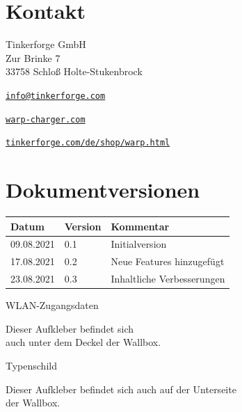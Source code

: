 \documentclass[a4paper,10pt]{article}
\begin{document}
\begin{multicols*}{2}
	\section{Kontakt}
	Tinkerforge GmbH\\ Zur Brinke 7\\ 33758 Schloß Holte-Stukenbrock\\
	\begin{description}[leftmargin=!,labelwidth=\widthof{\textbf{Website}}]
		\item[E-Mail] \href{mailto:info@tinkerforge.com}{\texttt{info@tinkerforge.com}}
		\item[Website] \href{https://warp-charger.com}{\texttt{warp-charger.com}}
		\item[Shop] \href{https://tinkerforge.com/de/shop/warp.html}{\texttt{tinkerforge.com/de/shop/warp.html}}
	\end{description}


	\section{Dokumentversionen}
	\begin{tabular}{lll}
		\toprule
		Datum      & Version & Kommentar                   \\
		\midrule
		09.08.2021 & 0.1     & Initialversion              \\
		17.08.2021 & 0.2     & Neue Features hinzugefügt   \\
		23.08.2021 & 0.3     & Inhaltliche Verbesserungen  \\
		\bottomrule
	\end{tabular}
	\newpage
	\pagestyle{empty}
	\null
	\newpage
	\null
	\vfill
	WLAN-Zugangsdaten
	\begin{tcolorbox}[width=4.2cm,height=2.7cm, boxrule=0.25mm]

	\end{tcolorbox}
	Dieser Aufkleber befindet sich\\ auch unter dem Deckel der Wallbox.
	\columnbreak

	\null
	\vfill
	Typenschild
	\begin{tcolorbox}[width=7.8cm,height=4.1cm, boxrule=0.25mm]

	\end{tcolorbox}
	Dieser Aufkleber befindet sich auch auf der Unterseite\\ der Wallbox.
\end{multicols*}
\end{document}
